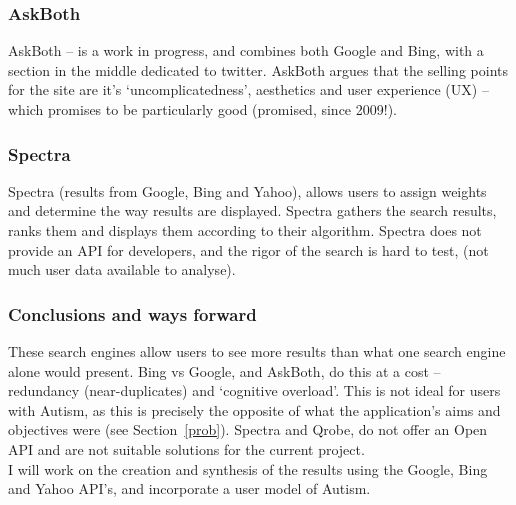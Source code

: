 \documentclass[a4paper, 11pt]{article}
\begin{document}
\subsubsection{AskBoth}
AskBoth – is a work in progress, and combines both Google and Bing, with a section in the middle dedicated to twitter. AskBoth argues that the selling points for the site are it’s ‘uncomplicatedness’, aesthetics and user experience (UX) – which promises to be particularly good (promised, since 2009!).

\subsubsection{Spectra}
Spectra (results from Google, Bing and Yahoo), allows users to assign weights and determine the way results are displayed. Spectra gathers the search results, ranks them and displays them according to their algorithm. Spectra does not provide an API for developers, and the rigor of the search is hard to test, (not much user data available to analyse).

\subsubsection{Conclusions and ways forward}
These search engines allow users to see more results than what one search engine alone would present. Bing vs Google, and AskBoth, do this at a cost -- redundancy (near-duplicates) and ‘cognitive overload’. This is not ideal for users with Autism, as this is precisely the opposite of what the application's aims and objectives were (see Section~\ref{prob}). Spectra and Qrobe, do not offer an Open API and are not suitable solutions for the current project. \\
I will work on the creation and synthesis of the results using the Google, Bing and Yahoo API's, and incorporate a user model of Autism.
\end{document}
